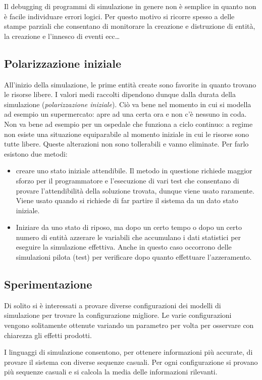 \documentclass[11pt]{book}
\begin{document}
Il debugging di programmi di simulazione in genere non \`e semplice in
quanto non \`e facile individuare errori logici. Per questo motivo si
ricorre spesso a delle stampe parziali che consentano di monitorare la
creazione e distruzione di entit\`a, la creazione e l'innesco di
eventi ecc\dots

\subsection{Polarizzazione iniziale}

All'inizio della simulazione, le prime entit\`a create sono favorite
in quanto trovano le risorse libere. I valori medi raccolti dipendono
dunque dalla durata della simulazione ({\em polarizzazione
  iniziale}). Ci\`o va bene nel momento in cui si modella ad esempio
un supermercato: apre ad una certa ora e non c'\`e nessuno in
coda. Non va bene ad esempio per un ospedale che funziona a ciclo
continuo: a regime non esiste una situazione equiparabile al momento
iniziale in cui le risorse sono tutte libere. Queste alterazioni non
sono tollerabili e vanno eliminate. Per farlo esistono due metodi:

\begin{itemize}
  
\item creare uno stato iniziale attendibile. Il metodo in questione
  richiede maggior sforzo per il programmatore e l'esecuzione di vari
  test che consentano di provare l'attendibilit\`a della soluzione
  trovata, dunque viene usato raramente. Viene usato quando si
  richiede di far partire il sistema da un dato stato iniziale.

\item Iniziare da uno stato di riposo, ma dopo un certo tempo o dopo
  un certo numero di entit\`a azzerare le variabili che accumulano i
  dati statistici per eseguire la simulazione effettiva. Anche in
  questo caso occorrono delle simulazioni pilota (test) per verificare
  dopo quanto effettuare l'azzeramento.

\end{itemize}

\subsection{Sperimentazione}

Di solito si \`e interessati a provare diverse configurazioni dei
modelli di simulazione per trovare la configurazione migliore. Le
varie configurazioni vengono solitamente ottenute variando un
parametro per volta per osservare con chiarezza gli effetti prodotti.

I linguaggi di simulazione consentono, per ottenere informazioni pi\`u
accurate, di provare il sistema con diverse sequenze casuali. Per ogni
configurazione si provano pi\`u sequenze casuali e si calcola la media
delle informazioni rilevanti.
\end{document}

